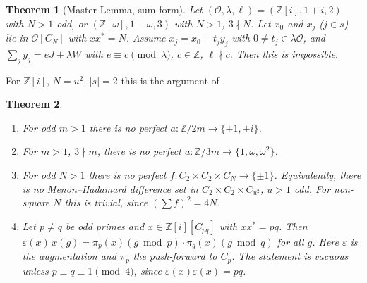 \documentclass[11pt]{amsart}
\newtheorem{theorem}{Theorem}
\theoremstyle{remark}
\newcommand{\Z}{\mathbb{Z}}
\begin{document}
\begin{theorem}[Master Lemma, sum form]\label{gml}
Let $(\mathcal O,\lambda,\ell)=(\Z[i],1+i,2)$ with $N>1$ odd, or
$(\Z[\omega],1-\omega,3)$ with $N>1$, $3\nmid N$. Let $x_0$ and $x_j$ ($j\in s$) lie in
$\mathcal O[C_N]$ with $xx^*=N$. Assume $x_j=x_0+t_jy_j$ with $0\neq t_j\in\lambda\mathcal O$, and
$\sum_j y_j=eJ+\lambda W$ with $e\equiv c\pmod\lambda$, $c\in\Z$, $\ell\nmid c$. Then this is
impossible.
\end{theorem}

For $\Z[i]$, $N=u^2$, $|s|=2$ this is the argument of \cite[\S4]{OAI179}.

\begin{theorem}\label{main}
\begin{enumerate}
\item[(Q)] For odd $m>1$ there is no perfect $a:\Z/2m\to\{\pm1,\pm i\}$.
\item[(T3)] For $m>1$, $3\nmid m$, there is no perfect $a:\Z/3m\to\{1,\omega,\omega^2\}$.
\item[(T1)] For odd $N>1$ there is no perfect $f:C_2\times C_2\times C_N\to\{\pm1\}$.
Equivalently, there is no Menon--Hadamard difference set in $C_2\times C_2\times C_{u^2}$, $u>1$ odd.
For non-square $N$ this is trivial, since $(\sum f)^2=4N$.
\item[(F)] Let $p\neq q$ be odd primes and $x\in\Z[i][C_{pq}]$ with $xx^*=pq$. Then
$\varepsilon(x)\,x(g)=\pi_p(x)(g\bmod p)\cdot\pi_q(x)(g\bmod q)$ for all $g$. Here $\varepsilon$ is
the augmentation and $\pi_p$ the push-forward to $C_p$. The statement is vacuous unless
$p\equiv q\equiv1\pmod 4$, since $\varepsilon(x)\overline{\varepsilon(x)}=pq$.
\end{enumerate}
\end{theorem}
\end{document}
